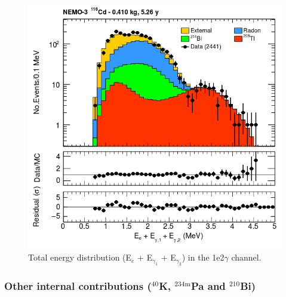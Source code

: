 \documentclass[main.tex]{subfiles}
\begin{document}
\begin{figure}[h!]
\centering
\includegraphics[scale=0.35]{pictures/Chap6/1e2gChannelEtot.png}
\caption{Total energy distribution (E$_e$ + E$_{\gamma_1}$ + E$_{\gamma_2}$) in the 1e2$\gamma$ channel.}
\label{1e2gChannel_Etot}
\end{figure}



\subsubsection{Other internal contributions ($^{\text{40}}$K, $^{\text{234m}}$Pa and $^{\text{210}}$Bi)}\label{sec:1echannel}
\end{document}
